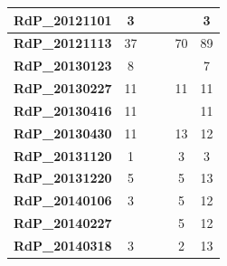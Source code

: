 \begin{table}
\begin{tabular}{|l|c|c|c|c|c|}
    {\color[HTML]{3166FF} \textbf{RdP\_20121101}}     & 3                        &                          &                          &                          & 3                        \\ \hline
    {\color[HTML]{3166FF} \textbf{RdP\_20121113}}     & 37                       &                          &                          & 70                       & 89                       \\ \hline
    {\color[HTML]{3166FF} \textbf{RdP\_20130123}}     & 8                        &                          &                          &                          & 7                        \\ \hline
    {\color[HTML]{3166FF} \textbf{RdP\_20130227}}     & 11                       &                          &                          & 11                       & 11                       \\ \hline
    {\color[HTML]{3166FF} \textbf{RdP\_20130416}}     & 11                       &                          &                          &                          & 11                       \\ \hline
    {\color[HTML]{3166FF} \textbf{RdP\_20130430}}     & 11                       &                          &                          & 13                       & 12                       \\ \hline
    {\color[HTML]{3166FF} \textbf{RdP\_20131120}}     & 1                        &                          &                          & 3                        & 3                        \\ \hline
    {\color[HTML]{3166FF} \textbf{RdP\_20131220}}     & 5                        &                          &                          & 5                        & 13                       \\ \hline
    {\color[HTML]{3166FF} \textbf{RdP\_20140106}}     & 3                        &                          &                          & 5                        & 12                       \\ \hline
    {\color[HTML]{3166FF} \textbf{RdP\_20140227}}     &                          &                          &                          & 5                        & 12                       \\ \hline
    {\color[HTML]{3166FF} \textbf{RdP\_20140318}}     & 3                        &                          &                          & 2                        & 13                       \\ \hline

\end{tabular}
\end{table}
